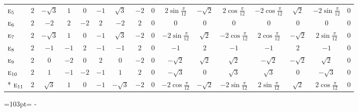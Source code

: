\documentclass[10pt,a4paper]{article}
\newcommand{\needspace}[1]{\par\penalty-100\begingroup\dimen0=#1\relax\dimen2=\pagegoal
  \advance\dimen2-\pagetotal\ifdim\dimen0>\dimen2\relax\ifdim\dimen2>0pt\vfil\break\fi\fi
  \endgroup}
\numberwithin{equation}{section}
\newcommand{\irr}[1]{\text{\normalfont\scshape #1}}
\begin{document}
{{\begin{longtable}{@{}lccccccccccccccc@{}}
$\irr{e}_{5}$ & $2$ & $-\sqrt{3}$ & $1$ & $0$ & $-1$ & $\sqrt{3}$ & $-2$ & $0$ & $2\sin\tfrac{\pi}{12}$ & $-\sqrt{2}$ & $2\cos\tfrac{\pi}{12}$ & $-2\cos\tfrac{\pi}{12}$ & $\sqrt{2}$ & $-2\sin\tfrac{\pi}{12}$ & $0$\\
$\irr{e}_{6}$ & $2$ & $-2$ & $2$ & $-2$ & $2$ & $-2$ & $2$ & $0$ & $0$ & $0$ & $0$ & $0$ & $0$ & $0$ & $0$\\
$\irr{e}_{7}$ & $2$ & $-\sqrt{3}$ & $1$ & $0$ & $-1$ & $\sqrt{3}$ & $-2$ & $0$ & $-2\sin\tfrac{\pi}{12}$ & $\sqrt{2}$ & $-2\cos\tfrac{\pi}{12}$ & $2\cos\tfrac{\pi}{12}$ & $-\sqrt{2}$ & $2\sin\tfrac{\pi}{12}$ & $0$\\
$\irr{e}_{8}$ & $2$ & $-1$ & $-1$ & $2$ & $-1$ & $-1$ & $2$ & $0$ & $-1$ & $2$ & $-1$ & $-1$ & $2$ & $-1$ & $0$\\
$\irr{e}_{9}$ & $2$ & $0$ & $-2$ & $0$ & $2$ & $0$ & $-2$ & $0$ & $-\sqrt{2}$ & $\sqrt{2}$ & $\sqrt{2}$ & $-\sqrt{2}$ & $-\sqrt{2}$ & $\sqrt{2}$ & $0$\\
$\irr{e}_{10}$ & $2$ & $1$ & $-1$ & $-2$ & $-1$ & $1$ & $2$ & $0$ & $-\sqrt{3}$ & $0$ & $\sqrt{3}$ & $\sqrt{3}$ & $0$ & $-\sqrt{3}$ & $0$\\*
$\irr{e}_{11}$ & $2$ & $\sqrt{3}$ & $1$ & $0$ & $-1$ & $-\sqrt{3}$ & $-2$ & $0$ & $-2\cos\tfrac{\pi}{12}$ & $-\sqrt{2}$ & $-2\sin\tfrac{\pi}{12}$ & $2\sin\tfrac{\pi}{12}$ & $\sqrt{2}$ & $2\cos\tfrac{\pi}{12}$ & $0$\\
\bottomrule\end{longtable}}}
\needspace{103pt}
\end{document}
